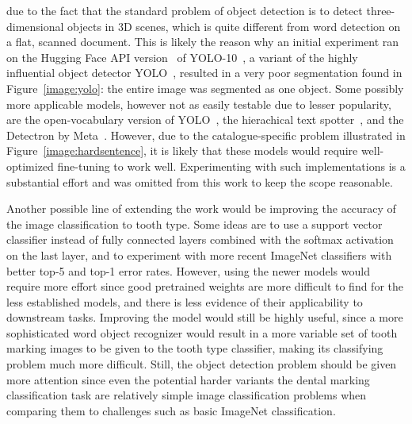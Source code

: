 \documentclass{article}
\begin{document}
due to the fact that the standard problem of object detection is to detect three-dimensional objects in 3D scenes, which is 
quite different from word detection on a flat, scanned document. This is likely the reason why an initial experiment 
ran on the Hugging Face API version~\cite{OmouredYOLOv10DocumentLayoutAnalysisHugging2023} of YOLO-10~\cite{wang2024yolov10}, a variant of the highly influential object detector YOLO~\cite{redmonYouOnlyLook2016},
resulted in a very poor segmentation found in Figure~\ref{image:yolo}: the entire image was segmented as one object.
Some possibly more applicable models, however not as easily testable due to lesser popularity, 
are the open-vocabulary version of YOLO~\cite{YOLOWorldRealTimeOpenVocabulary},
 the hierachical text spotter~\cite{longHierarchicalTextSpotter2024}, and the Detectron by Meta~\cite{Detectron}.
 However, due to the catalogue-specific problem illustrated in Figure~\ref{image:hardsentence}, it is likely that these 
 models would require well-optimized fine-tuning to work well. Experimenting with such implementations is a 
 substantial effort and was omitted from this work to keep the scope reasonable.

Another possible line of extending the work would be improving the accuracy of the image classification to tooth type. 
Some ideas are to use a support vector classifier instead of fully connected layers combined with the softmax activation 
on the last layer, and to experiment with more recent ImageNet classifiers with better top-5 and top-1 error rates.
However, using the newer models would require more effort since good pretrained weights are 
more difficult to find for the less established models, and there is less evidence of their applicability to downstream tasks.
Improving the model would still be highly useful, since a more sophisticated word object recognizer would result in a more 
variable set of tooth marking images to be given to the tooth type classifier, making its classifying problem much more difficult. 
Still, the object detection problem should be given more attention since even the 
potential harder variants the dental marking classification task are relatively simple image classification problems when comparing 
them to challenges such as basic ImageNet classification.
\end{document}
